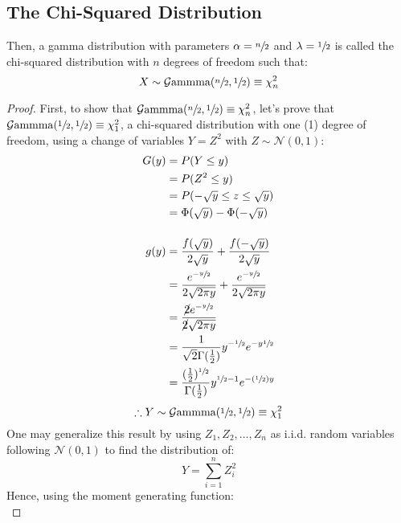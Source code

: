 \documentclass[12pt]{article}
\newcommand{\G}{\mathcal{G}}
\newcommand{\N}{\mathcal{N}}
\begin{document}
\subsection{The Chi-Squared Distribution}\label{subsec:specialcases:chi2}
Then, a gamma distribution with parameters $\alpha=\sfrac{n}{2}$ and $\lambda=\sfrac{1}{2}$ is called the
chi-squared distribution with $n$ degrees of freedom such that:
\begin{equation}
	X\sim\G\text{ammma}(\sfrac{n}{2}, \sfrac{1}{2})\equiv\chi^2_n
\end{equation}
\begin{proof}
	First, to show that $\G\text{ammma}(\sfrac{n}{2},\sfrac{1}{2})\equiv\chi^2_n$, let's prove that
	$\G\text{ammma}(\sfrac{1}{2},\sfrac{1}{2})\equiv\chi^2_1$, a chi-squared distribution with one (1) degree of
	freedom, using a change of variables $Y=Z^2$ with $Z\sim\N(0, 1)$:
	\begin{equation}\label{eq:relation:chisquared:1}
		\begin{split}
			G(y)	&=	P(Y\leq y)\\
					&=	P(Z^2\leq y)\\
					&=	P(-\sqrt{y}\leq z \leq \sqrt{y})\\
					&=	\Phi(\sqrt{y})-\Phi(-\sqrt{y})\\[12pt]
			g(y)	&=	\frac{f(\sqrt{y})}{2\sqrt{y}}+\frac{f(-\sqrt{y})}{2\sqrt{y}}\\
					&=	\frac{e^{-\sfrac{y}{2}}}{2\sqrt{2\pi y}} + \frac{e^{-\sfrac{y}{2}}}{2\sqrt{2\pi y}}\\
					&=	\frac{\cancel{2}e^{-\sfrac{y}{2}}}{\cancel{2}\sqrt{2\pi y}}\\
					&=	\frac{1}{\sqrt{2}\Gamma(\frac{1}{2})}y^{-\sfrac{1}{2}}e^{-y\sfrac{1}{2}}\\
					&=	\frac{(\frac{1}{2})^{\sfrac{1}{2}}}{\Gamma(\frac{1}{2})}y^{\sfrac{1}{2}-1}e^{-(\sfrac{1}{2})y}
			\end{split}
	\end{equation}
	\begin{equation}
		\therefore Y\sim\G\text{ammma}(\sfrac{1}{2}, \sfrac{1}{2})\equiv\chi^2_1
	\end{equation}
	One may generalize this result by using $Z_1, Z_2, \ldots, Z_n$ as i.i.d. random variables following $\N(0, 1)$ to
	find the distribution of:
	\begin{equation}
		Y = \sum^n_{i=1}Z^2_i
	\end{equation}
	Hence, using the moment generating function:
	\begin{equation}\label{eq:relation:chisquared:n}

\end{equation}
\end{proof}
\end{document}
